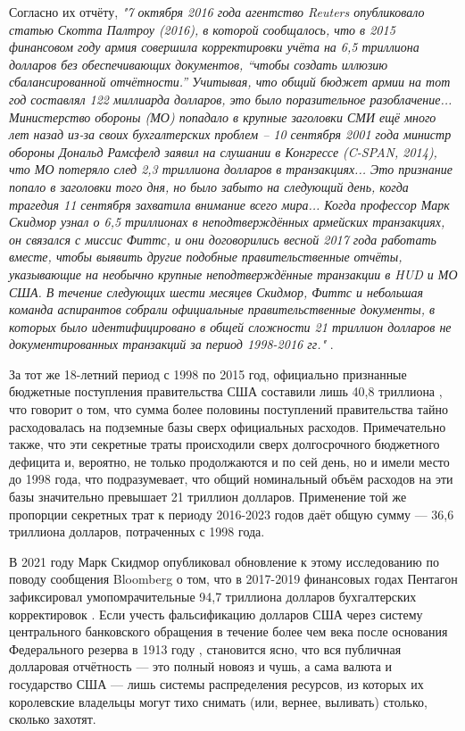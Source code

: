 \documentclass[10pt,twocolumn,letterpaper]{article}
\begin{document}
Согласно их отчёту, \textit{"7 октября 2016 года агентство Reuters опубликовало статью Скотта Палтроу (2016), в которой сообщалось, что в 2015 финансовом году армия совершила корректировки учёта на 6,5 триллиона долларов без обеспечивающих документов, “чтобы создать иллюзию сбалансированной отчётности.” Учитывая, что общий бюджет армии на тот год составлял 122 миллиарда долларов, это было поразительное разоблачение... Министерство обороны (МО) попадало в крупные заголовки СМИ ещё много лет назад из-за своих бухгалтерских проблем – 10 сентября 2001 года министр обороны Дональд Рамсфелд заявил на слушании в Конгрессе (C-SPAN, 2014), что МО потеряло след 2,3 триллиона долларов в транзакциях... Это признание попало в заголовки того дня, но было забыто на следующий день, когда трагедия 11 сентября захватила внимание всего мира... Когда профессор Марк Скидмор узнал о 6,5 триллионах в неподтверждённых армейских транзакциях, он связался с миссис Фиттс, и они договорились весной 2017 года работать вместе, чтобы выявить другие подобные правительственные отчёты, указывающие на необычно крупные неподтверждённые транзакции в HUD и МО США. В течение следующих шести месяцев Скидмор, Фиттс и небольшая команда аспирантов собрали официальные правительственные документы, в которых было идентифицировано в общей сложности 21 триллион долларов не документированных транзакций за период 1998-2016 гг."} \cite{12}.

За тот же 18-летний период с 1998 по 2015 год, официально признанные бюджетные поступления правительства США составили лишь 40{,}8 триллиона \cite{15}, что говорит о том, что сумма более половины поступлений правительства тайно расходовалась на подземные базы сверх официальных расходов. Примечательно также, что эти секретные траты происходили сверх долгосрочного бюджетного дефицита и, вероятно, не только продолжаются и по сей день, но и имели место до 1998 года, что подразумевает, что общий номинальный объём расходов на эти базы значительно превышает 21 триллион долларов. Применение той же пропорции секретных трат к периоду 2016-2023 годов даёт общую сумму — 36,6 триллиона долларов, потраченных с 1998 года.

В 2021 году Марк Скидмор опубликовал обновление к этому исследованию по поводу сообщения Bloomberg о том, что в 2017-2019 финансовых годах Пентагон зафиксировал умопомрачительные 94,7 триллиона долларов бухгалтерских корректировок \cite{17,18}. Если учесть фальсификацию долларов США через систему центрального банковского обращения в течение более чем века после основания Федерального резерва в 1913 году \cite{37}, становится ясно, что вся публичная долларовая отчётность — это полный новояз и чушь, а сама валюта и государство США — лишь системы распределения ресурсов, из которых их королевские владельцы могут тихо снимать (или, вернее, выливать) столько, сколько захотят.
\end{document}
